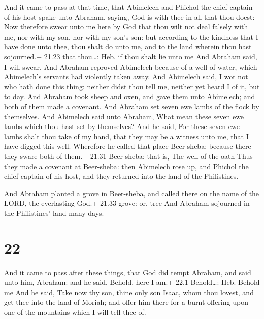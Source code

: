  And it came to pass at that time, that Abimelech and
Phichol the chief captain of his host spake unto Abraham, saying, God is
with thee in all that thou doest:  Now therefore swear unto
me here by God that thou wilt not deal falsely with me, nor with my son,
nor with my son's son: but according to the kindness that I have done
unto thee, thou shalt do unto me, and to the land wherein thou hast
sojourned.+ 21.23 that thou\ldots: Heb. if thou shalt lie unto me
 And Abraham said, I will swear.  And Abraham
reproved Abimelech because of a well of water, which Abimelech's
servants had violently taken away.  And Abimelech said, I
wot not who hath done this thing: neither didst thou tell me, neither
yet heard I of it, but to day.  And Abraham took sheep and
oxen, and gave them unto Abimelech; and both of them made a covenant.
 And Abraham set seven ewe lambs of the flock by
themselves.  And Abimelech said unto Abraham, What mean
these seven ewe lambs which thou hast set by themselves? 
And he said, For these seven ewe lambs shalt thou take of my hand, that
they may be a witness unto me, that I have digged this well.
 Wherefore he called that place Beer-sheba; because there
they sware both of them.+ 21.31 Beer-sheba: that is, The well of the
oath  Thus they made a covenant at Beer-sheba: then
Abimelech rose up, and Phichol the chief captain of his host, and they
returned into the land of the Philistines.

 And Abraham planted a grove in Beer-sheba, and called
there on the name of the LORD, the everlasting God.+ 21.33 grove: or,
tree  And Abraham sojourned in the Philistines' land many
days.

\hypertarget{section-21}{%
\section{22}\label{section-21}}

 And it came to pass after these things, that God did tempt
Abraham, and said unto him, Abraham: and he said, Behold, here I am.+
22.1 Behold\ldots: Heb. Behold me  And he said, Take now thy
son, thine only son Isaac, whom thou lovest, and get thee into the land
of Moriah; and offer him there for a burnt offering upon one of the
mountains which I will tell thee of.

